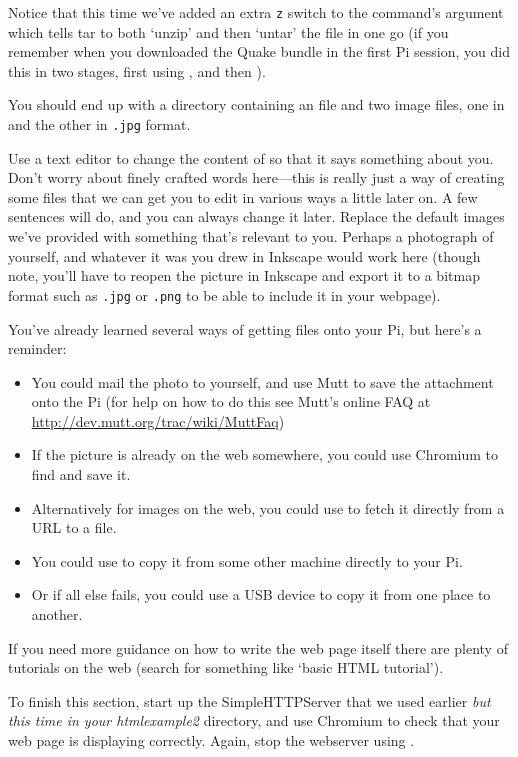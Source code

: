 Notice that this time we've added an extra \texttt{z} switch to the  command's argument which tells tar to both `unzip' and then `untar' the file in one go (if you remember when you downloaded the Quake bundle in the first Pi session, you did this in two stages, first using , and then ).

You should end up with a  directory containing an  file and two image files, one in  and the other in \texttt{.jpg} format.

Use a text editor to change the content of  so that it says something about you. Don't worry about finely crafted words here---this is really just a way of creating some files that we can get you to edit in various ways a little later on. A few sentences will do, and you can always change it later. Replace the default images we've provided with something that's relevant to you. Perhaps a photograph of yourself, and whatever it was you drew in Inkscape would work here (though note, you'll have to reopen the picture in Inkscape and export it to a bitmap format such as \texttt{.jpg} or \texttt{.png} to be able to include it in your webpage).

You've already learned several ways of getting files onto your Pi, but here's a reminder:
\begin{itemize}
\item You could mail the photo to yourself, and use Mutt to save the attachment onto the Pi (for help on how to do this see Mutt's online FAQ at \url{http://dev.mutt.org/trac/wiki/MuttFaq})
\item If the picture is already on the web somewhere, you could use Chromium to find and save it.
\item Alternatively for images on the web, you could use  to fetch it directly from a URL to a file.
\item You could use  to copy it from some other machine directly to your Pi.
\item Or if all else fails, you could use a USB device to copy it from one place to another.
\end{itemize}

If you need more guidance on how to write the web page itself there are plenty of tutorials on the web (search for something like `basic HTML tutorial').

To finish this section, start up the SimpleHTTPServer that we used
earlier \textit{but this time in your htmlexample2} directory, and use
Chromium to check that your web page is displaying correctly. Again,
stop the webserver using .

